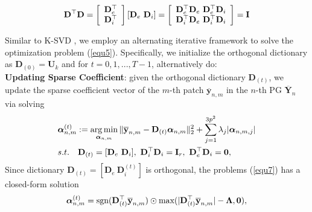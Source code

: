 \documentclass[10pt,twocolumn,letterpaper]{article}
\DeclareMathOperator*{\argmin}{arg\,min}
\begin{document}
\begin{equation}\label{equ6}\vspace{-1mm}
\mathbf{D}^{\top}\mathbf{D} = 
\left[\begin{array}{c}
\mathbf{D}_{e}^{\top}
\\
\mathbf{D}_{i}^{\top}
\end{array}\right]
[\mathbf{D}_{e}\ \mathbf{D}_{i}]
=
\left[\begin{array}{cc}
\mathbf{D}_{e}^{\top}\mathbf{D}_{e}\ \mathbf{D}_{e}^{\top}\mathbf{D}_{i}
\\
\mathbf{D}_{i}^{\top}\mathbf{D}_{e}\ \mathbf{D}_{i}^{\top}\mathbf{D}_{i}
\end{array}\right]
=
\mathbf{I}
\end{equation}

Similar to K-SVD \cite{ksvd}, we employ an alternating iterative framework to solve the optimization problem (\ref{equ5}). Specifically, we initialize the orthogonal dictionary as $\mathbf{D}_{(0)}=\mathbf{U}_{k}$ and for $t=0, 1, ..., T-1$, alternatively do:
\\
\textbf{Updating Sparse Coefficient}: given the orthogonal dictionary $\textbf{D}_{(t)}$, we update the sparse coefficient vector of the $m$-th patch $\mathbf{\overline{y}}_{n,m}$ in the $n$-th PG $\mathbf{\overline{Y}}_{n}$ via solving
\vspace{-3mm}
\begin{equation}\label{equ7}\vspace{-3mm}
\begin{split}
&\bm{\alpha}_{n,m}^{(t)}:=\argmin_{\bm{\alpha}_{n,m}}
\|\mathbf{\overline{y}}_{n,m}-\mathbf{D}_{(t)}\bm{\alpha}_{n,m}\|_{2}^{2}+\sum_{j=1}^{3p^{2}}\lambda_{j}|\bm{\alpha}_{n,m,j}|
\\
&
s.t.
\quad
\mathbf{D}_{(t)}=[\mathbf{D}_{e}\ \mathbf{D}_{i}],\ \mathbf{D}_{i}^{\top}\mathbf{D}_{i} = \mathbf{I}_{r},\ \mathbf{D}_{e}^{\top}\mathbf{D}_{i} = \mathbf{0},
\end{split}
\end{equation}
Since dictionary $\mathbf{D}_{(t)}=[\mathbf{D}_{e}\ \mathbf{D}_{i}^{(t)}]$ is orthogonal, the problems (\ref{equ7}) has a closed-form solution \cite{pgpd} 
\vspace{-1mm}
\begin{equation}\label{equ8}\vspace{-1mm}
\bm{\alpha}_{n,m}^{(t)}= \text{sgn}(\mathbf{D}_{(t)}^{\top}\mathbf{\overline{y}}_{n,m})\odot \text{max}(|\mathbf{D}_{(t)}^{\top}\mathbf{\overline{y}}_{n,m}|-\mathbf{\Lambda},\mathbf{0}),
\end{equation}
\end{document}
